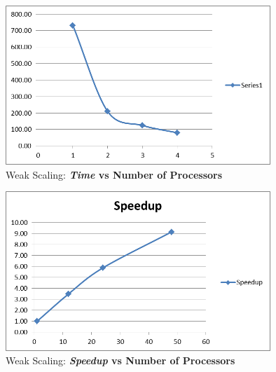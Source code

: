 \documentclass[]{article}
\begin{document}
\begin{figure}[h!]
    \centering
    \includegraphics[width=10cm]{weak_times.png}
    \caption{Weak Scaling: \textbf{\textit{Time} vs Number of Processors}}
\end{figure}

\begin{figure}[h!]
    \centering
    \includegraphics[width=10cm]{weak_speedup.png}
    \caption{Weak Scaling: \textbf{\textit{Speedup} vs Number of Processors}}
\end{figure}






\newpage
\end{document}
